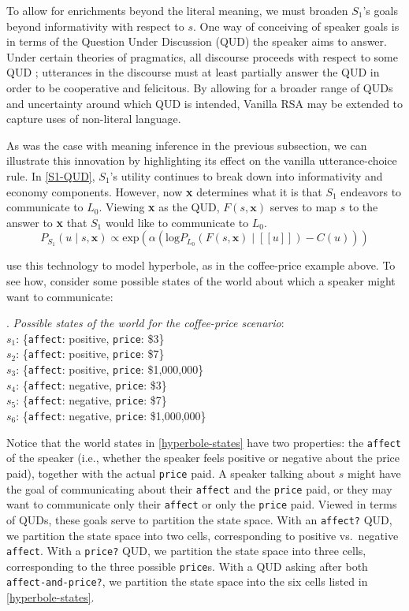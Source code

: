 \documentclass{sp}
\newcommand{\sem}[1]{\ensuremath{[\![#1]\!]}}
\begin{document}
To allow for enrichments beyond the literal meaning, we must broaden $S_1$'s goals beyond informativity with respect to $s$. One way of conceiving of speaker goals is in terms of the Question Under Discussion (QUD) the speaker aims to answer. Under certain theories of pragmatics, all discourse proceeds with respect to some QUD \citep{roberts2012}; utterances in the discourse must at least partially answer the QUD in order to be cooperative and felicitous. By allowing for a broader range of QUDs and uncertainty around which QUD is intended, Vanilla RSA may be extended to capture uses of non-literal language.

As was the case with meaning inference in the previous subsection, we can illustrate this innovation by highlighting its effect on the vanilla utterance-choice rule. In \eqref{S1-QUD}, $S_1$'s utility continues to break down into informativity and economy components. However, now \textbf{x} determines what it is that $S_1$ endeavors to communicate to $L_0$. Viewing \textbf{x} as the QUD, $F(s,\textbf{x})$ serves to map $s$ to the answer to \textbf{x} that $S_1$ would like to communicate to $L_0$.
\begin{equation} \label{S1-QUD}
P_{S_1}(u\mid s, \textbf{x}) \propto \textrm{exp}(\alpha (\textrm{log}P_{L_0}(F(s,\textbf{x})\mid \sem{u}) - C(u)))
\end{equation}

\cite{kaoetal2014} use this technology to model hyperbole, as in the coffee-price example above. To see how, consider some possible states of the world about which a speaker might want to communicate:

\ex. \label{hyperbole-states}
\emph{Possible states of the world for the coffee-price scenario}:\\
$s_1$: \{\texttt{affect}: positive, \texttt{price}: \$3\}\\
$s_2$: \{\texttt{affect}: positive, \texttt{price}: \$7\}\\
$s_3$: \{\texttt{affect}: positive, \texttt{price}: \$1,000,000\}\\
$s_4$: \{\texttt{affect}: negative, \texttt{price}: \$3\}\\
$s_5$: \{\texttt{affect}: negative, \texttt{price}: \$7\}\\
$s_6$: \{\texttt{affect}: negative, \texttt{price}: \$1,000,000\}

Notice that the world states in \ref{hyperbole-states} have two properties: the \texttt{affect} of the speaker (i.e., whether the speaker feels positive or negative about the price paid), together with the actual \texttt{price} paid. A speaker talking about $s$ might have the goal of communicating about their \texttt{affect} and the \texttt{price} paid, or they may want to communicate only their \texttt{affect} or only the \texttt{price} paid. Viewed in terms of QUDs, these goals serve to partition the state space. With an \texttt{affect?} QUD, we partition the state space into two cells, corresponding to positive vs.~negative \texttt{affect}. With a \texttt{price?} QUD, we partition the state space into three cells, corresponding to the three possible \texttt{price}s. With a QUD asking after both \texttt{affect-and-price?}, we partition the state space into the six cells listed in \ref{hyperbole-states}.
\end{document}

